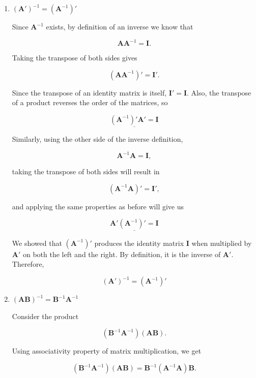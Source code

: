 \documentclass[12pt]{article}
\begin{document}
\begin{enumerate}
\item[(a)] $(\mathbf{A}')^{-1} = (\mathbf{A}^{-1})'$

\vspace{0.5em}

\noindent Since $\mathbf{A}^{-1}$ exists, by definition of an inverse we know that

$$
\mathbf{A}\mathbf{A}^{-1} = \mathbf{I}.
$$

\noindent Taking the transpose of both sides gives

$$
(\mathbf{A}\mathbf{A}^{-1})' = \mathbf{I}'.
$$

\noindent Since the transpose of an identity matrix is itself, $\mathbf{I}' = \mathbf{I}$. Also, the transpose of a product reverses the order of the matrices, so

$$
\underline{
(\mathbf{A}^{-1})'\mathbf{A}' = \mathbf{I}
}
$$

\noindent Similarly, using the other side of the inverse definition,

$$
\mathbf{A}^{-1}\mathbf{A} = \mathbf{I},
$$

\noindent taking the transpose of both sides will result in

$$
(\mathbf{A}^{-1}\mathbf{A})' = \mathbf{I}',
$$

\noindent and applying the same properties  as before will give us

$$
\underline{
\mathbf{A}'(\mathbf{A}^{-1})' = \mathbf{I}
}
$$

\noindent We showed that $(\mathbf{A}^{-1})'$ produces the identity matrix $\mathbf{I}$ when multiplied by $\mathbf{A}'$ on both the left and the right. By definition, it is the inverse of $\mathbf{A}'$. Therefore,

$$
\boxed{
(\mathbf{A}')^{-1}=(\mathbf{A}^{-1})'
}
$$

\item[(b)] $(\mathbf{A}\mathbf{B})^{-1} = \mathbf{B}^{-1}\mathbf{A}^{-1}$

\vspace{0.5em}

\noindent Consider the product

$$
(\mathbf{B}^{-1}\mathbf{A}^{-1})(\mathbf{A}\mathbf{B}).
$$

\noindent Using associativity property of matrix multiplication, we get

$$
(\mathbf{B}^{-1}\mathbf{A}^{-1})(\mathbf{A}\mathbf{B})
=
\mathbf{B}^{-1}(\mathbf{A}^{-1}\mathbf{A})\mathbf{B}.
$$


\end{enumerate}
\end{document}
